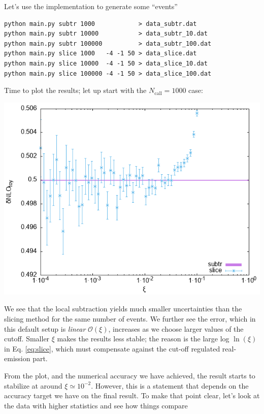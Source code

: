 \documentclass[11pt]{article}
\begin{document}
Let's use the implementation to generate some ``events''
\begin{verbatim}
python main.py subtr 1000            > data_subtr.dat
python main.py subtr 10000           > data_subtr_10.dat
python main.py subtr 100000          > data_subtr_100.dat
python main.py slice 1000   -4 -1 50 > data_slice.dat
python main.py slice 10000  -4 -1 50 > data_slice_10.dat
python main.py slice 100000 -4 -1 50 > data_slice_100.dat
\end{verbatim}
Time to plot the results; let up start with the \(N_\mathrm{call}=1000\) case:
\begin{center}
\includegraphics[width=.9\linewidth]{data.png}
\end{center}
We see that the local subtraction yields much smaller uncertainties than the slicing method for the same number of events.
We further see the error, which in this default setup is \emph{linear} \(\mathcal{O}(\xi)\), increases as we choose larger values of the cutoff.
Smaller \(\xi\) makes the results less stable; the reason is the large log \(\ln(\xi)\) in Eq. \eqref{eq:slice}, which must compensate against the cut-off regulated real-emission part.

From the plot, and the numerical accuracy we have achieved, the result starts to stabilize at around \(\xi \simeq 10^{-2}\).
However, this is a statement that depends on the accuracy target we have on the final result.
To make that point clear, let's look at the data with higher statistics and see how things compare
\end{document}
